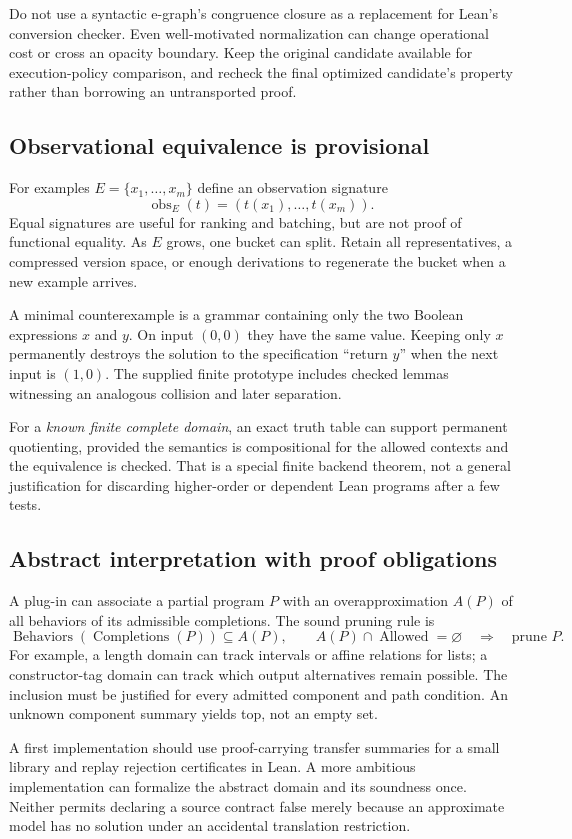 Do not use a syntactic e-graph's congruence closure as a replacement for Lean's conversion checker. Even well-motivated normalization can change operational cost or cross an opacity boundary. Keep the original candidate available for execution-policy comparison, and recheck the final optimized candidate's property rather than borrowing an untransported proof.

\subsection{Observational equivalence is provisional}

For examples $E=\{x_1,\ldots,x_m\}$ define an observation signature
\[
 \operatorname{obs}_E(t)=(t(x_1),\ldots,t(x_m)).
\]
Equal signatures are useful for ranking and batching, but are not proof of functional equality. As $E$ grows, one bucket can split. Retain all representatives, a compressed version space, or enough derivations to regenerate the bucket when a new example arrives.

A minimal counterexample is a grammar containing only the two Boolean expressions $x$ and $y$. On input $(0,0)$ they have the same value. Keeping only $x$ permanently destroys the solution to the specification ``return $y$'' when the next input is $(1,0)$. The supplied finite prototype includes checked lemmas witnessing an analogous collision and later separation.

For a \emph{known finite complete domain}, an exact truth table can support permanent quotienting, provided the semantics is compositional for the allowed contexts and the equivalence is checked. That is a special finite backend theorem, not a general justification for discarding higher-order or dependent Lean programs after a few tests.

\subsection{Abstract interpretation with proof obligations}

A plug-in can associate a partial program $P$ with an overapproximation $A(P)$ of all behaviors of its admissible completions. The sound pruning rule is
\[
 \operatorname{Behaviors}(\operatorname{Completions}(P))\subseteq A(P),
 \qquad A(P)\cap\operatorname{Allowed}=\varnothing
 \quad\Longrightarrow\quad\text{prune }P.
\]
For example, a length domain can track intervals or affine relations for lists; a constructor-tag domain can track which output alternatives remain possible. The inclusion must be justified for every admitted component and path condition. An unknown component summary yields top, not an empty set.

A first implementation should use proof-carrying transfer summaries for a small library and replay rejection certificates in Lean. A more ambitious implementation can formalize the abstract domain and its soundness once. Neither permits declaring a source contract false merely because an approximate model has no solution under an accidental translation restriction.
